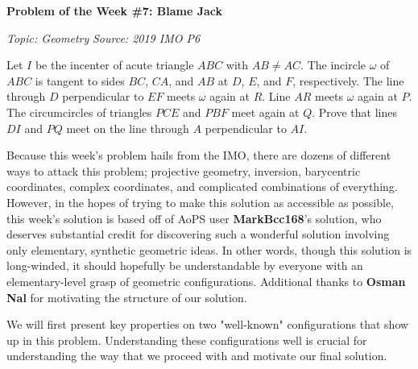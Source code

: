 \begin{potw}\vspace{5pt}
{\large\textbf{Problem of the Week \#7: Blame Jack}}\vspace{5pt}

\textit{Topic: Geometry}\newline
\textit{Source: 2019 IMO P6}\V

Let $I$ be the incenter of acute triangle $ABC$ with $AB \neq AC$. The incircle $\omega$ of $ABC$ is tangent to sides $BC$, $CA$, and $AB$ at $D$, $E$, and $F$, respectively. The line through $D$ perpendicular to $EF$ meets $\omega$ again at $R$. Line $AR$ meets $\omega$ again at $P$. The circumcircles of triangles $PCE$ and $PBF$ meet again at $Q$. Prove that lines $DI$ and $PQ$ meet on the line through $A$ perpendicular to $AI$.
\end{potw}\V

Because this week's problem hails from the IMO, there are dozens of different ways to attack this problem; projective geometry, inversion, barycentric coordinates, complex coordinates, and complicated combinations of everything. However, in the hopes of trying to make this solution as accessible as possible, this week's solution is based off of AoPS user \textbf{MarkBcc168}'s solution, who deserves substantial credit for discovering such a wonderful solution involving only elementary, synthetic geometric ideas. In other words, though this solution is long-winded, it should hopefully be understandable by everyone with an elementary-level grasp of geometric configurations. Additional thanks to \textbf{Osman Nal} for motivating the structure of our solution. \V

We will first present key properties on two "well-known" configurations that show up in this problem. Understanding these configurations well is crucial for understanding the way that we proceed with and motivate our final solution. 
